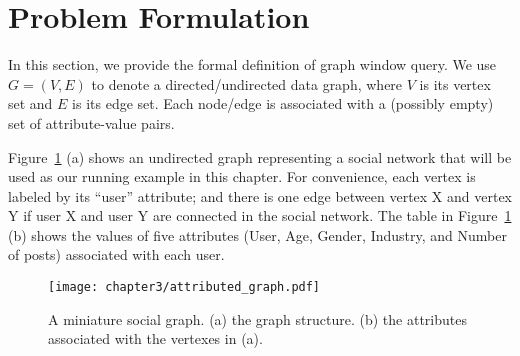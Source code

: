 \section{Problem Formulation}\label{gw:sec:pf}
In this section, we provide the formal definition of graph window query.
We use $G = (V,E)$ to denote a directed/undirected data graph, where $V$ is its vertex set and $E$ is its edge set.
Each node/edge is associated with a (possibly empty) set of attribute-value pairs.


Figure~\ref{fig:attributed} (a) shows an undirected graph representing 
a social network that will be used as our running example in this chapter. 
For convenience, each vertex is labeled by its ``user'' attribute;
and there is one edge between vertex X and vertex Y if user X and user Y are connected in the social network.
The table in Figure~\ref{fig:attributed} (b) shows the values of five attributes (User, Age, Gender, Industry, and Number of posts) associated with each user.


\begin{figure}[h]
\centering
\texttt{[image: chapter3/attributed\_graph.pdf]}
	\caption{A miniature social graph. (a) the graph structure. (b) the attributes associated with the vertexes in (a).} 
	\label{fig:attributed}
\end{figure}

